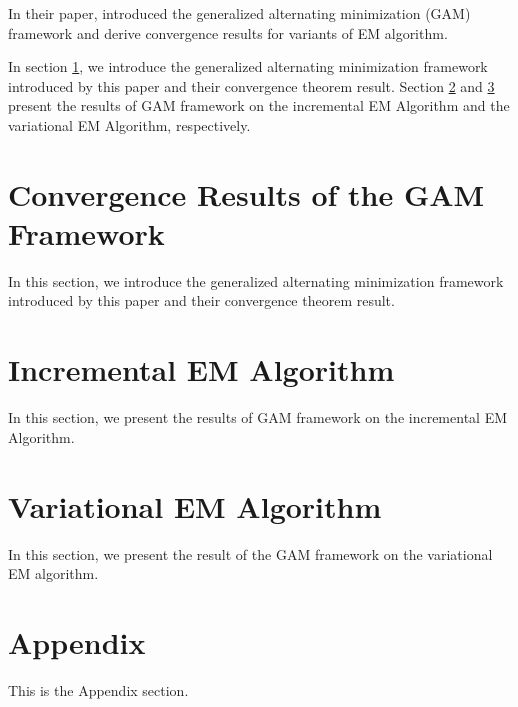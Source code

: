 \documentclass[11pt]{article}
\begin{document}
	In their paper, \cite{gunawardana2005convergence} introduced the generalized alternating minimization (GAM) framework and derive convergence results for variants of EM algorithm.
	
	In section \ref{gam}, we introduce the generalized alternating  minimization framework introduced by this paper and their convergence theorem result. Section \ref{incremental} and \ref{variational} present the results of GAM framework on the incremental EM Algorithm and the variational EM Algorithm, respectively.
	 
	\section{Convergence Results of the GAM Framework} \label{gam}
	In this section, we introduce the generalized alternating  minimization framework introduced by this paper and their convergence theorem result.
	\section{Incremental EM Algorithm} \label{incremental}
	In this section, we present the results of GAM framework on the incremental EM Algorithm. 
	
	\section{Variational EM Algorithm} \label{variational}
	In this section, we present the result of the GAM framework on the variational EM algorithm.
	
	\section*{Appendix}
	This is the Appendix section.
	
	
    
\end{document}
